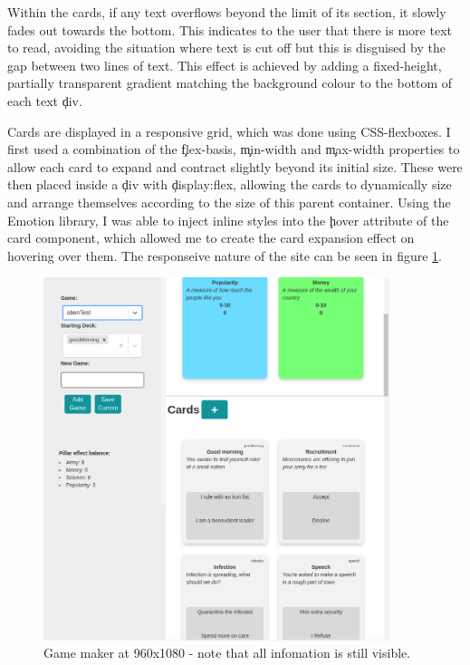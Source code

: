 Within the cards, if any text overflows beyond the limit of its section, it slowly fades out towards the bottom. This indicates to the user that there is more text to read, avoiding the situation where text is cut off but this is disguised by the gap between two lines of text. This effect is achieved by adding a fixed-height, partially transparent gradient matching the background colour to the bottom of each text \c{div}.

Cards are displayed in a responsive grid, which was done using CSS-flexboxes. I first used a combination of the \c{flex-basis}, \c{min-width} and \c{max-width} properties to allow each card to expand and contract slightly beyond its initial size. These were then placed inside a \c{div} with \c{display:flex}, allowing the cards to dynamically size and arrange themselves according to the size of this parent container. Using the Emotion\cite{Emotion} library, I was able to inject inline styles into the \c{hover} attribute of the card component, which allowed me to create the card expansion effect on hovering over them. The responseive nature of the site can be seen in figure \ref{fig:responsive}.

\begin{figure}[!h]
	\centering
	\includegraphics[width=0.9\textwidth]{./images/impl/responsive.png}
	\caption{Game maker at 960x1080 - note that all infomation is still visible.}
	\label{fig:responsive}
\end{figure}

